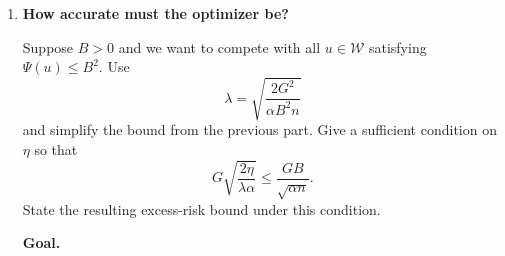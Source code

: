 \documentclass[11pt]{article}
\newcommand{\E}{\mathbb{E}}
\begin{document}
\begin{enumerate}
\begin{solutionbox}
\[
\boxed{
\E_S
L_{\mathcal D}(\widetilde w_S)
\le
L_{\mathcal D}(u)
+
\lambda\Psi(u)
+
\frac{2G^2}{\lambda\alpha n}
+
G
\sqrt{
\frac{2\eta}
     {\lambda\alpha}
}
}.
\]

\medskip

\textbf{Interpretation.}

The first three terms,

\[
L_{\mathcal D}(u)
+
\lambda\Psi(u)
+
\frac{2G^2}{\lambda\alpha n},
\]

are exactly the same terms that appear in the learning guarantee for exact RERM.

The additional term

\[
G
\sqrt{
\frac{2\eta}
     {\lambda\alpha}
}
\]

is the cost of approximate optimization. It measures how much population risk can be lost because we stop optimization before reaching the exact minimizer.

As the optimization error \(\eta\) approaches zero, this additional term vanishes, and the bound reduces to the original exact-RERM guarantee.

\medskip

\textbf{Remark.}

One might try to prove this result using the approximate-stability bound from Part B.2. However, that approach introduces an additional optimization-error contribution and produces a weaker bound.

The sharper argument is to compare \(\widetilde w_S\) directly to the exact minimizer \(w_S\), use Lipschitzness of the population loss, and then apply the distance estimate from Part B.1. This yields exactly one optimization-error term, which is the bound requested in the problem.

\end{solutionbox}

\item \textbf{How accurate must the optimizer be?}

Suppose $B>0$ and we want to compete with all $u\in\mathcal W$ satisfying $\Psi(u)\le B^2$. Use
\[
\lambda=\sqrt{\frac{2G^2}{\alpha B^2n}}
\]
and simplify the bound from the previous part. Give a sufficient condition on $\eta$ so that
\[
G\sqrt{\frac{2\eta}{\lambda\alpha}}
\le
\frac{GB}{\sqrt{\alpha n}}.
\]
State the resulting excess-risk bound under this condition.

\begin{solutionbox}

\textbf{Goal.}


\end{solutionbox}
\end{enumerate}
\end{document}

